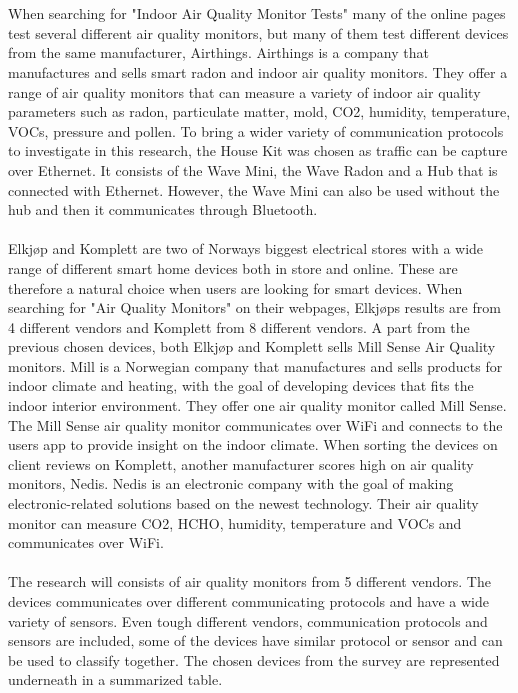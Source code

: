 \\\\
When searching for "Indoor Air Quality Monitor Tests" many of the online pages test several different air quality monitors, but many of them test different devices from the same manufacturer, Airthings. \cite{AQMTest1} \cite{AQMTest2} \cite{AQMTest3} Airthings \cite{Airthings} is a company that manufactures and sells smart radon and indoor air quality monitors. They offer a range of air quality monitors that can measure a variety of indoor air quality parameters such as radon, particulate matter, mold, CO2, humidity, temperature, VOCs, pressure and pollen. \cite{AirthingsProducts} To bring a wider variety of communication protocols to investigate in this research, the House Kit was chosen as traffic can be capture over Ethernet. It consists of the Wave Mini, the Wave Radon and a Hub that is connected with Ethernet. \cite{AirthingsProducts} However, the Wave Mini can also be used without the hub and then it communicates through Bluetooth. 
\\\\
Elkjøp \cite{Elkjøp} and Komplett \cite{Komplett} are two of Norways biggest electrical stores with a wide range of different smart home devices both in store and online. These are therefore a natural choice when users are looking for smart devices. When searching for "Air Quality Monitors" on their webpages, Elkjøps results are from 4 different vendors and Komplett from 8 different vendors. A part from the previous chosen devices, both Elkjøp and Komplett sells Mill Sense Air Quality monitors. Mill \cite{Mill} is a Norwegian company that manufactures and sells products for indoor climate and heating, with the goal of developing devices that fits the indoor interior environment. They offer one air quality monitor called Mill Sense. The Mill Sense air quality monitor communicates over WiFi and connects to the users app to provide insight on the indoor climate. When sorting the devices on client reviews on Komplett, another manufacturer scores high on air quality monitors, Nedis. \cite{Komplett} Nedis \cite{Nedis} is an electronic company with the goal of making electronic-related solutions based on the newest technology. Their air quality monitor can measure CO2, HCHO, humidity, temperature and VOCs and communicates over WiFi. 
\\\\
The research will consists of air quality monitors from 5 different vendors. The devices communicates over different communicating protocols and have a wide variety of sensors. Even tough different vendors, communication protocols and sensors are included, some of the devices have similar protocol or sensor and can be used to classify together. The chosen devices from the survey are represented underneath in a summarized table. 
